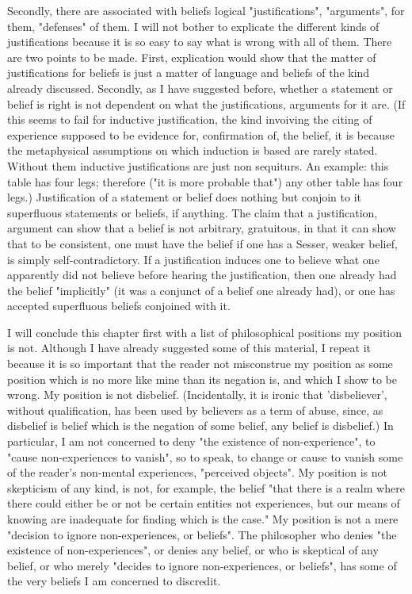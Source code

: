 \documentclass[10pt,twoside,draft]{memoir}
\begin{document}
{Secondly, there are associated with beliefs logical "justifications", 
"arguments", for them, "defenses" of them. I will not bother to explicate 
the different kinds of justifications because it is so easy to say what is wrong 
with all of them. There are two points to be made. First, explication would 
show that the matter of justifications for beliefs is just a matter of language 
and beliefs of the kind already discussed. Secondly, as I have suggested 
before, whether a statement or belief is right is not dependent on what the 
justifications, arguments for it are. (If this seems to fail for inductive 
justification, the kind invoiving the citing of experience supposed to be 
evidence for, confirmation of, the belief, it is because the metaphysical 
assumptions on which induction is based are rarely stated. Without them 
inductive justifications are just non sequiturs. An example: this table has 
four legs; therefore ("it is more probable that") any other table has four 
legs.) Justification of a statement or belief does nothing but conjoin to it 
superfluous statements or beliefs, if anything. The claim that a justification, 
argument can show that a belief is not arbitrary, gratuitous, in that it can 
show that to be consistent, one must have the belief if one has a Sesser, 
weaker belief, is simply self-contradictory. If a justification induces one to 
believe what one apparently did not believe before hearing the justification, 
then one already had the belief "implicitly" (it was a conjunct of a belief 
one already had), or one has accepted superfluous beliefs conjoined with it. 

I will conclude this chapter first with a list of philosophical positions 
my position is not. Although I have already suggested some of this material, 
I repeat it because it is so important that the reader not misconstrue my 
position as some position which is no more like mine than its negation is, 
and which I show to be wrong. My position is not disbelief. (Incidentally, it 
is ironic that 'disbeliever', without qualification, has been used by believers 
as a term of abuse, since, as disbelief is belief which is the negation of some 
belief, any belief is disbelief.) In particular, I am not concerned to deny "the 
existence of non-experience", to "cause non-experiences to vanish", so to 
speak, to change or cause to vanish some of the reader's non-mental 
experiences, "perceived objects". My position is not skepticism of any kind, 
is not, for example, the belief "that there is a realm where there could either 
be or not be certain entities not experiences, but our means of knowing are 
inadequate for finding which is the case." My position is not a mere 
"decision to ignore non-experiences, or beliefs". The philosopher who denies 
"the existence of non-experiences", or denies any belief, or who is skeptical 
of any belief, or who merely "decides to ignore non-experiences, or beliefs", 
has some of the very beliefs I am concerned to discredit. 

}
\end{document}
